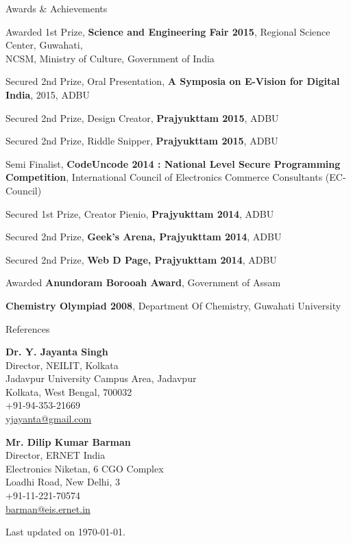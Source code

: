 \documentclass{resume}
\begin{document}
\begin{rSection}{Awards \& Achievements}
	
	\item Awarded 1st Prize, \textbf{Science and Engineering Fair 2015}, Regional Science Center, Guwahati,\\NCSM, Ministry of Culture, Government of India
	\item Secured 2nd Prize, Oral Presentation, \textbf{A Symposia on E-Vision for Digital India}, 2015, ADBU
	\item Secured 2nd Prize, Design Creator, \textbf{Prajyukttam 2015}, ADBU
	\item Secured 2nd Prize, Riddle Snipper, \textbf{Prajyukttam 2015}, ADBU
	\item Semi Finalist, \textbf{CodeUncode 2014 : National Level Secure Programming Competition}, International Council of Electronics Commerce Consultants (EC-Council)
	\item Secured 1st Prize, Creator Pienio, \textbf{Prajyukttam 2014}, ADBU
	\item Secured 2nd Prize, \textbf{Geek's Arena, Prajyukttam 2014}, ADBU
	\item Secured 2nd Prize, \textbf{Web D Page, Prajyukttam 2014}, ADBU
	\item Awarded \textbf{Anundoram Borooah Award}, Government of Assam \item \textbf{Chemistry Olympiad 2008}, Department Of Chemistry, Guwahati University
	    
\end{rSection}

\begin{rSection}{References}
	
	\begin{minipage}[t]{0.5\textwidth}
		\textbf{Dr. Y. Jayanta Singh}\\
		Director, NEILIT, Kolkata\\
		Jadavpur University Campus Area, Jadavpur\\
		Kolkata, West Bengal, 700032\\
		+91-94-353-21669\\
		\href{mailto:yjayanta@gmail.com}{yjayanta@gmail.com}
	\end{minipage}
	\begin{minipage}[t]{0.5\textwidth}
		\textbf{Mr. Dilip Kumar Barman}\\
		Director, ERNET India\\
		Electronics Niketan, 6 CGO Complex\\
		Loadhi Road, New Delhi, 3\\
		+91-11-221-70574\\
		\href{mailto:barman@eis.ernet.in}{barman@eis.ernet.in}
	\end{minipage}
	    
	\begin{rSubsection}{}{}
		{}{}
		\item \small{Last updated on \today}.
	\end{rSubsection}
	    
\end{rSection}
\end{document}
